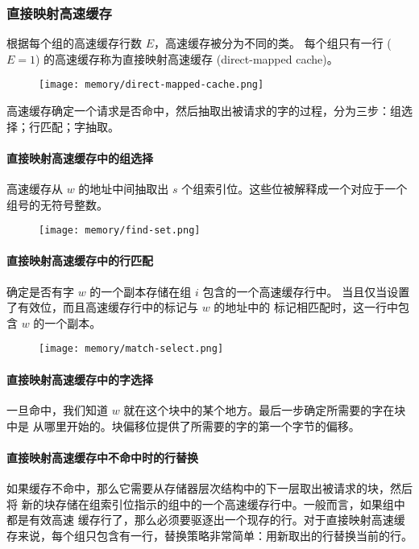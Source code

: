 \subsubsection{直接映射高速缓存}
根据每个组的高速缓存行数 $E$，高速缓存被分为不同的类。
每个组只有一行 ($E=1$) 的高速缓存称为直接映射高速缓存 (direct-mapped cache)。

\begin{figure}[H]
    \centering
    \texttt{[image: memory/direct-mapped-cache.png]}
\end{figure}

高速缓存确定一个请求是否命中，然后抽取出被请求的字的过程，分为三步：组选择；行匹配；字抽取。

\paragraph{直接映射高速缓存中的组选择}
高速缓存从 $w$ 的地址中间抽取出 $s$ 个组索引位。这些位被解释成一个对应于一个组号的无符号整数。
\begin{figure}[H]
    \centering
    \texttt{[image: memory/find-set.png]}
\end{figure}

\paragraph{直接映射高速缓存中的行匹配}
确定是否有字 $w$ 的一个副本存储在组 $i$ 包含的一个高速缓存行中。
当且仅当设置了有效位，而且高速缓存行中的标记与 $w$ 的地址中的
标记相匹配时，这一行中包含 $w$ 的一个副本。
\begin{figure}[H]
    \centering
    \texttt{[image: memory/match-select.png]}
\end{figure}

\paragraph{直接映射高速缓存中的字选择}
一旦命中，我们知道 $w$ 就在这个块中的某个地方。最后一步确定所需要的字在块中是
从哪里开始的。块偏移位提供了所需要的字的第一个字节的偏移。

\paragraph{直接映射高速缓存中不命中时的行替换}
如果缓存不命中，那么它需要从存储器层次结构中的下一层取出被请求的块，然后将
新的块存储在组索引位指示的组中的一个高速缓存行中。一般而言，如果组中都是有效高速
缓存行了，那么必须要驱逐出一个现存的行。对于直接映射高速缓存来说，每个组只包含有一行，替换策略非常简单：用新取出的行替换当前的行。

